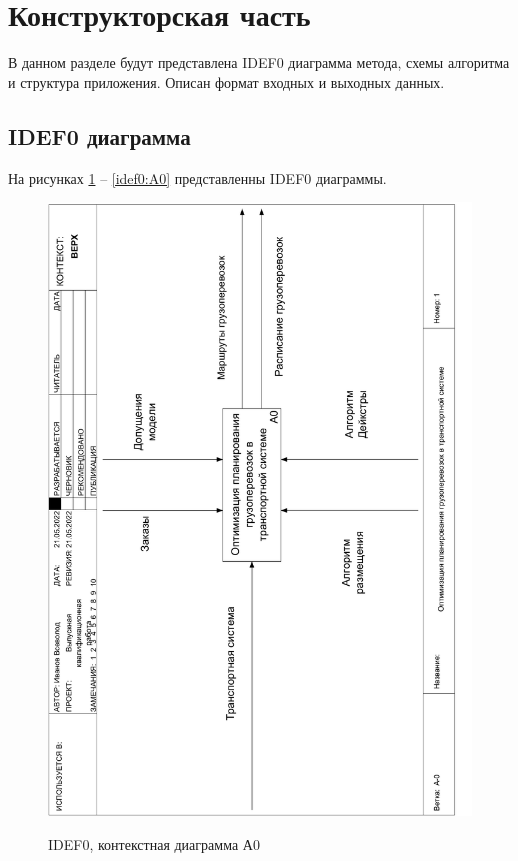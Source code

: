 \section{Конструкторская часть}
В данном разделе будут представлена IDEF0 диаграмма метода, схемы алгоритма и структура приложения. Описан формат входных и выходных данных.

\subsection{IDEF0 диаграмма}
На рисунках \ref{idef0:top} -- \ref{idef0:A0} представленны IDEF0 диаграммы.

\begin{figure}[h]
	\begin{center}
		{\includegraphics[scale=0.63, angle=-90, page=1]{img/idef0.pdf}}
		\caption{IDEF0, контекстная диаграмма А0}
		\label{idef0:top}
	\end{center}
\end{figure}

